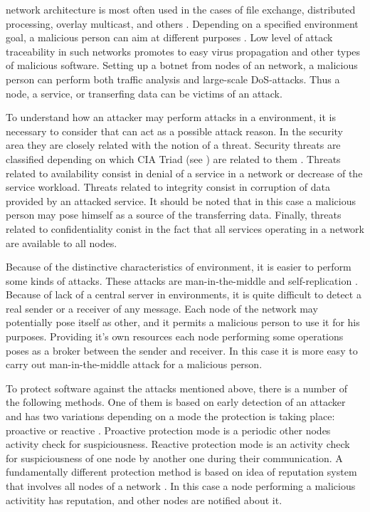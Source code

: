 %
 network architecture is most often used in the cases of file exchange, distributed processing, overlay multicast, and others . 
%
Depending on a specified  environment goal, a malicious person can aim at different purposes  . 
%
Low level of attack traceability in such networks promotes to easy virus propagation and other types of malicious software. 
%
Setting up a botnet from nodes of an  network, a malicious person can perform both traffic analysis and large-scale DoS-attacks. 
%
Thus a node, a service, or transerfing data can be victims of an attack. 

%
To understand how an attacker may perform attacks in a  environment, it is necessary to consider that can act as a possible attack reason. 
%
In the security area they are closely related with the notion of a threat. 
%
Security threats are classified depending on which CIA Triad (see ) are related to them   . 
%
Threats related to availability consist in denial of a service in a network or decrease of the service workload. 
%
Threats related to integrity consist in corruption of data provided by an attacked service. 
%
It should be noted that in this case a malicious person may pose himself as a source of the transferring data. 
%
Finally, threats related to confidentiality conist in the fact that all services operating in a network are available to all nodes. 

%
Because of the distinctive characteristics of  environment, it is easier to perform some kinds of attacks. 
%
These attacks are man-in-the-middle and self-replication . 
%
Because of lack of a central server in  environments, it is quite difficult to detect a real sender or a receiver of any message. 
%
Each node of the network may potentially pose itself as other, and it permits a malicious person to use it for his purposes. 
%
Providing it's own resources each node performing some operations poses as a broker between the sender and receiver. 
%
In this case it is more easy to carry out man-in-the-middle attack for a malicious person. 

%
To protect software against the attacks mentioned above, there is a number of the following methods. 
%
One of them is based on early detection of an attacker and has two variations depending on a mode the protection is taking place: proactive or reactive . 
%
Proactive protection mode is a periodic other nodes activity check for suspiciousness. 
%
Reactive protection mode is an activity check for suspiciousness of one node by another one during their communication. 
%
A fundamentally different protection method is based on idea of reputation system that involves all nodes of a  network  . 
%
In this case a node performing a malicious activitity has  reputation, and other nodes are notified about it. 

